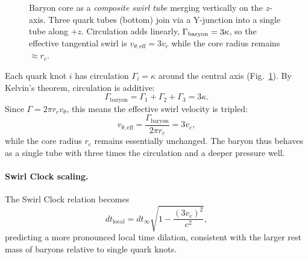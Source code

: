 \documentclass[reprint,aps,onecolumn,nofootinbib]{revtex4-2}
\begin{document}
\begin{figure}[t]
        \caption{Baryon core as a \emph{composite swirl tube} merging vertically on the \(z\)-axis. Three quark tubes (bottom) join via a Y-junction into a single tube along \(+z\). Circulation adds linearly, \(\Gamma_{\rm baryon}=3\kappa\), so the effective tangential swirl is \(v_{\theta,\mathrm{eff}} = 3 v_c\) while the core radius remains \(\approx r_c\).}
        \label{fig:baryon_composite_tube}
        \end{figure}



    Each quark knot $i$ has circulation $\Gamma_i = \kappa$ around the central axis (Fig.~\ref{fig:baryon_composite_tube}).
    By Kelvin's theorem, circulation is additive:
    \begin{equation}
    \Gamma_{\mathrm{baryon}} = \Gamma_1 + \Gamma_2 + \Gamma_3
    = 3 \kappa.
    \end{equation}
    Since $\Gamma = 2\pi r_c v_\theta$, this means the effective swirl velocity is tripled:
    \begin{equation}
    v_{\theta,\mathrm{eff}} = \frac{\Gamma_{\mathrm{baryon}}}{2\pi r_c} = 3 v_c,
    \end{equation}
    while the core radius $r_c$ remains essentially unchanged.
    The baryon thus behaves as a single tube with three times the circulation and a deeper pressure well.

    \paragraph{Swirl Clock scaling.}
        The Swirl Clock relation becomes
        \begin{equation}
        dt_{\mathrm{local}} = dt_\infty \sqrt{1 - \frac{(3 v_c)^2}{c^2}},
        \end{equation}
        predicting a more pronounced local time dilation, consistent with the larger rest mass of baryons relative to single quark knots.
\end{document}
